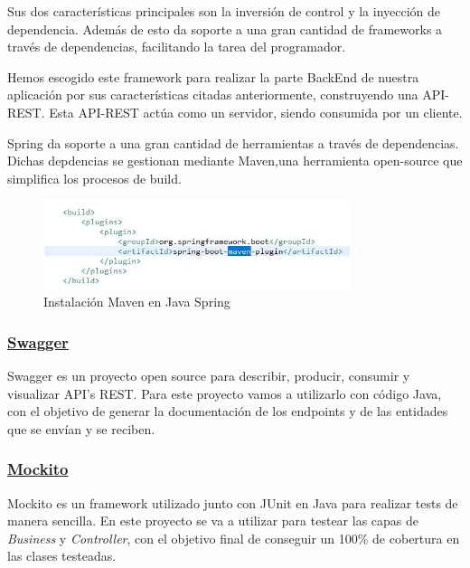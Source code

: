      Sus dos características principales son la inversión de control y la inyección de dependencia. Además de esto da soporte a una gran cantidad de frameworks a través de dependencias, facilitando la tarea del programador.
     \newline
     
     Hemos escogido este framework para realizar la parte BackEnd de nuestra aplicación por sus características citadas anteriormente, construyendo una API-REST. Esta API-REST actúa como un servidor, siendo consumida por un cliente.
     \newline
    
    Spring da soporte a una gran cantidad de herramientas a través de dependencias. Dichas depdencias se gestionan mediante Maven,una herramienta open-source que simplifica los procesos de build.
    
    \begin{figure}[h]
    \centering
    \includegraphics[width=0.8\textwidth]{images/maven}
    \caption{Instalación Maven en Java Spring}
    \end{figure}
    
    

        \subsubsection{\underline{Swagger}}
        Swagger es un proyecto open source para describir, producir, consumir y visualizar API’s REST. Para este proyecto vamos a utilizarlo con código Java, con el objetivo de generar la documentación de los endpoints y de las entidades que se envían y se reciben.

        
        \subsubsection{\underline{Mockito}}
        Mockito es un framework utilizado junto con JUnit en Java para realizar tests de manera sencilla. En este proyecto se va a utilizar para testear las capas de \emph{Business} y \emph{Controller}, con el objetivo final de conseguir un 100\% de cobertura en las clases testeadas.
        \newline
        

